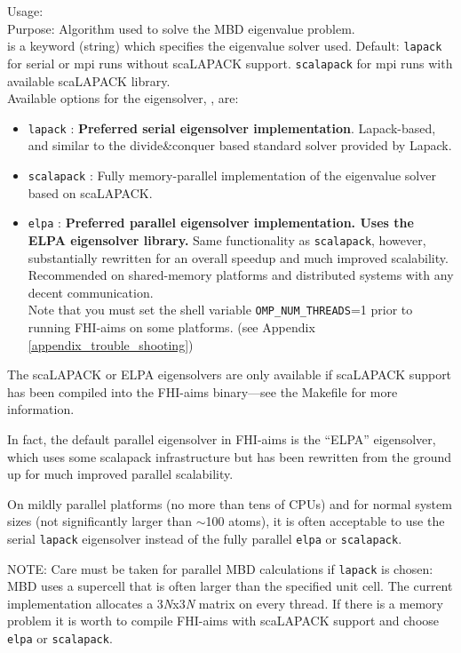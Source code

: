 {
  \noindent 
  Usage:   \\[1.0ex]
  Purpose: Algorithm used to solve the MBD eigenvalue problem.\\[1.0ex]
   is a keyword (string) which specifies the eigenvalue solver
    used. Default: \texttt{lapack} for serial or mpi runs without scaLAPACK  
    support. \texttt{scalapack} for mpi runs with available scaLAPACK library. \\ 
}
Available options for the eigensolver, , are:
\begin{itemize}
  \item \texttt{lapack} : \textbf{Preferred 
    serial eigensolver implementation}. Lapack-based, and similar to the
    divide\&conquer based standard solver provided by Lapack.
  \item \texttt{scalapack} :  Fully memory-parallel implementation of 
    the eigenvalue solver based on scaLAPACK.
  \item \texttt{elpa} : \textbf{Preferred 
    parallel eigensolver implementation. Uses the ELPA eigensolver library.}
    Same functionality as \texttt{scalapack}, however, substantially 
    rewritten for an overall speedup and much improved scalability.
    Recommended on shared-memory platforms and distributed systems with any
    decent communication. \\
    Note that you must set the shell variable \texttt{OMP\_NUM\_THREADS}=1 
    prior to running FHI-aims on some platforms. 
    (see Appendix \ref{appendix_trouble_shooting})
\end{itemize}
The scaLAPACK or ELPA eigensolvers are only available if scaLAPACK
support has been compiled into the FHI-aims binary---see the Makefile
for more information. 

In fact, the default parallel eigensolver in FHI-aims is the ``ELPA''
eigensolver, which uses some scalapack infrastructure but has been
rewritten from the ground up for much improved parallel scalability.

On mildly parallel platforms (no more than tens
of CPUs) and for normal system sizes (not significantly larger than
$\sim$100 atoms), it is often acceptable to use the serial
\texttt{lapack} eigensolver instead of the fully parallel
\texttt{elpa} or \texttt{scalapack}.

NOTE: Care must be taken for parallel MBD calculations if \texttt{lapack} is chosen: MBD uses a supercell that is often larger than the specified unit cell. The current implementation allocates a 3{\it N}x3{\it N} matrix on every thread. If there is a memory problem it is worth to compile FHI-aims with scaLAPACK support and choose \texttt{elpa} or \texttt{scalapack}.

